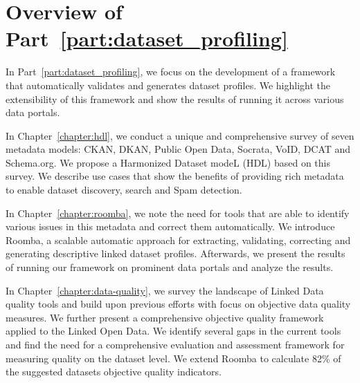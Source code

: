 \chapter*{Overview of Part~\ref{part:dataset_profiling}}

In Part~\ref{part:dataset_profiling}, we focus on the development of a framework that automatically validates and generates dataset profiles. We highlight the extensibility of this framework and show the results of running it across various data portals.

In Chapter~\ref{chapter:hdl}, we conduct a unique and comprehensive survey of seven metadata models: CKAN, DKAN, Public Open Data, Socrata, VoID, DCAT and Schema.org. We propose a Harmonized Dataset modeL (HDL) based on this survey. We describe use cases that show the benefits of providing rich metadata to enable dataset discovery, search and Spam detection.

In Chapter~\ref{chapter:roomba}, we note the need for tools that are able to identify various issues in this metadata and correct them automatically. We introduce Roomba, a scalable automatic approach for extracting, validating, correcting and generating descriptive linked dataset profiles. Afterwards, we present the results of running our framework on prominent data portals and analyze the results.

In Chapter~\ref{chapter:data-quality}, we survey the landscape of Linked Data quality tools and build upon previous efforts with focus on objective data quality measures. We further present a comprehensive objective quality framework applied to the Linked Open Data. We identify several gaps in the current tools and find the need for a comprehensive evaluation and assessment framework for measuring quality on the dataset level. We extend Roomba to calculate 82\% of the suggested datasets objective quality indicators.